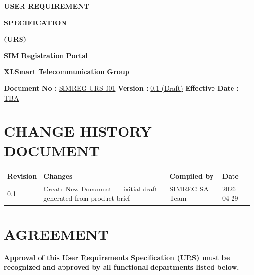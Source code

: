 \documentclass[12pt,a4paper]{article}
\begin{document}
\begin{titlepage}
\centering
\vspace{1cm}
{\Huge\bfseries USER REQUIREMENT\par}
\vspace{0.5cm}
{\Huge\bfseries SPECIFICATION\par}
\vspace{0.5cm}
{\Huge\bfseries (URS)\par}
\vfill

{\Large\bfseries SIM Registration Portal\par}
\vspace{0.5cm}
{\Large\bfseries XLSmart Telecommunication Group\par}
\vspace{1cm}
\begin{flushleft}
\textbf{Document No :} \underline{SIMREG-URS-001\hspace{2cm}}
\vspace{0.5cm}
\textbf{Version :} \underline{0.1 (Draft)\hspace{4cm}}
\vspace{0.5cm}
\textbf{Effective Date :} \underline{TBA\hspace{4.5cm}}
\end{flushleft}
\end{titlepage}

\newpage

\section*{CHANGE HISTORY DOCUMENT}

\begin{longtable}{|p{3cm}|p{4cm}|p{3cm}|p{3cm}|}
\hline
\textbf{Revision} & \textbf{Changes} & \textbf{Compiled by} & \textbf{Date} \\
\hline
0.1 & Create New Document — initial draft generated from product brief & SIMREG SA Team & 2026-04-29 \\
\hline
\end{longtable}

\newpage

\section*{AGREEMENT}

\textbf{Approval of this User Requirements Specification (URS) must be recognized and approved by all functional departments listed below.}
\end{document}
